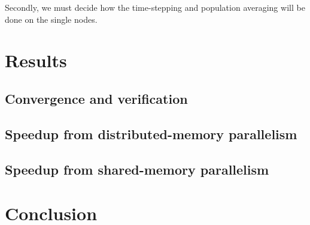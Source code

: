 \documentclass{article}
\begin{document}
Secondly, we must decide how the time-stepping and population averaging will be done on the single nodes. 

\section{Results} \label{results}

\subsection{Convergence and verification}

\subsection{Speedup from distributed-memory parallelism}

\subsection{Speedup from shared-memory parallelism}

\section{Conclusion} \label{conclusion}
\end{document}

